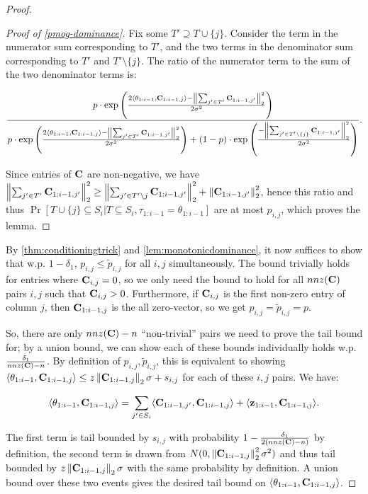 \begin{proof}
\begin{proof}[Proof of \cref{pmog-dominance}]
Fix some $T' \supseteq T \cup \{j\}$. Consider the term in the numerator sum corresponding to $T'$, and the two terms in the denominator sum corresponding to $T'$ and $T' \setminus \{j\}$. The ratio of the numerator term to the sum of the two denominator terms is:

\[\frac{p \cdot \exp\left(\frac{2 \langle \theta_{1:i-1}, \mathbf{C}_{1:i-1,j}\rangle-\left\|\sum_{j' \in T'}  \mathbf{C}_{1:i-1, j'}\right\|_2^2}{2 \sigma^2}\right)}{p \cdot \exp\left(\frac{2 \langle \theta_{1:i-1}, \mathbf{C}_{1:i-1,j}\rangle-\left\|\sum_{j' \in T'}  \mathbf{C}_{1:i-1, j'}\right\|_2^2}{2 \sigma^2}\right) + (1 - p) \cdot \exp\left(\frac{-\left\|\sum_{j' \in T' \setminus \{j\}}  \mathbf{C}_{1:i-1, j'}\right\|_2^2}{2 \sigma^2}\right)}.\]

Since entries of $\mathbf{C}$ are non-negative, we have $\left\|\sum_{j' \in T'}  \mathbf{C}_{1:i-1, j'}\right\|_2^2 \geq \left\|\sum_{j' \in T' \setminus j}  \mathbf{C}_{1:i-1, j'}\right\|_2^2 + \left\|\mathbf{C}_{1:i-1, j'}\right\|_2^2$, hence this ratio and thus $\Pr[T \cup \{j\} \subseteq S_i | T \subseteq S_i, \tau_{1:i-1} = \theta_{1:i-1}]$ are at most $p_{i,j}$, which proves the lemma.
\end{proof}

By \cref{thm:conditioningtrick} and \cref{lem:monotonicdominance}, it now suffices to show that w.p. $1-\delta_1$, $p_{i, j} \leq \tilde{p}_{i, j}$ for all $i, j$ simultaneously. The bound trivially holds for entries where $\mathbf{C}_{i,j} = 0$, so we only need the bound to hold for all $nnz(\mathbf{C})$ pairs $i,j$ such that $\mathbf{C}_{i,j} > 0$. Furthermore, if $\mathbf{C}_{i,j}$ is the first non-zero entry of column $j$, then $\mathbf{C}_{1:i-1,j}$ is the all zero-vector, so we get $p_{i,j} = \tilde{p}_{i,j} = p$. 

So, there are only $nnz(\mathbf{C}) - n$ ``non-trivial'' pairs we need to prove the tail bound for; by a union bound, we can show each of these bounds individually holds w.p. $\frac{\delta_1}{nnz(\mathbf{C}) - n}$. By definition of $p_{i, j}, \tilde{p}_{i, j}$, this is equivalent to showing $\langle \theta_{1:i-1}, \mathbf{C}_{1:i-1, j} \rangle \leq z \left\|\mathbf{C}_{1:i-1,j}\right\|_2 \sigma + s_{i,j}$ for each of these $i, j$ pairs. We have:

\[\langle \theta_{1:i-1}, \mathbf{C}_{1:i-1, j} \rangle = \sum_{j' \in S_i} \langle \mathbf{C}_{1:i-1, j'}, \mathbf{C}_{1:i-1, j} \rangle + \langle \mathbf{z}_{1:i-1}, \mathbf{C}_{1:i-1, j}\rangle.\]

The first term is tail bounded by $s_{i,j}$ with probability $1-\frac{\delta_1}{2(nnz(\mathbf{C}) - n)}$ by definition, the second term is drawn from $N(0, \left\|\mathbf{C}_{1:i-1, j}\right\|_2^2 \sigma^2)$ and thus tail bounded by $z \left\|\mathbf{C}_{1:i-1, j}\right\|_2 \sigma$ with the same probability by definition. A union bound over these two events gives the desired tail bound on $\langle \theta_{1:i-1}, \mathbf{C}_{1:i-1, j} \rangle$.
\end{proof}

